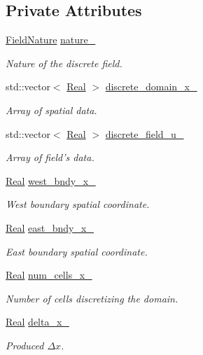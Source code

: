 \subsection*{Private Attributes}
\begin{DoxyCompactItemize}
\item 
\hyperlink{group__c02-enums_ga4c54f2a329cfb4e56213b02a259d19e2}{Field\+Nature} \hyperlink{classmtk_1_1UniStgGrid1D_a061b66c92532b1498ce0e15418754911}{nature\+\_\+}
\begin{DoxyCompactList}\small\item\em Nature of the discrete field. \end{DoxyCompactList}\item 
std\+::vector$<$ \hyperlink{group__c01-roots_gac080bbbf5cbb5502c9f00405f894857d}{Real} $>$ \hyperlink{classmtk_1_1UniStgGrid1D_a0a1f9c00e21659e05f414dd97e2a52e3}{discrete\+\_\+domain\+\_\+x\+\_\+}
\begin{DoxyCompactList}\small\item\em Array of spatial data. \end{DoxyCompactList}\item 
std\+::vector$<$ \hyperlink{group__c01-roots_gac080bbbf5cbb5502c9f00405f894857d}{Real} $>$ \hyperlink{classmtk_1_1UniStgGrid1D_a9a1e7c4ff7f83787a1844d8b24af8045}{discrete\+\_\+field\+\_\+u\+\_\+}
\begin{DoxyCompactList}\small\item\em Array of field's data. \end{DoxyCompactList}\item 
\hyperlink{group__c01-roots_gac080bbbf5cbb5502c9f00405f894857d}{Real} \hyperlink{classmtk_1_1UniStgGrid1D_a6910438d3396d0b9a130d11d16979c46}{west\+\_\+bndy\+\_\+x\+\_\+}
\begin{DoxyCompactList}\small\item\em West boundary spatial coordinate. \end{DoxyCompactList}\item 
\hyperlink{group__c01-roots_gac080bbbf5cbb5502c9f00405f894857d}{Real} \hyperlink{classmtk_1_1UniStgGrid1D_a69a7d6be3171e53177e476348d04f4ae}{east\+\_\+bndy\+\_\+x\+\_\+}
\begin{DoxyCompactList}\small\item\em East boundary spatial coordinate. \end{DoxyCompactList}\item 
\hyperlink{group__c01-roots_gac080bbbf5cbb5502c9f00405f894857d}{Real} \hyperlink{classmtk_1_1UniStgGrid1D_afa43750db0029b7454aef343759e7097}{num\+\_\+cells\+\_\+x\+\_\+}
\begin{DoxyCompactList}\small\item\em Number of cells discretizing the domain. \end{DoxyCompactList}\item 
\hyperlink{group__c01-roots_gac080bbbf5cbb5502c9f00405f894857d}{Real} \hyperlink{classmtk_1_1UniStgGrid1D_a12577bbe0b88e9a0ac9b2267f2fcc48c}{delta\+\_\+x\+\_\+}
\begin{DoxyCompactList}\small\item\em Produced $ \Delta x$. \end{DoxyCompactList}\end{DoxyCompactItemize}
